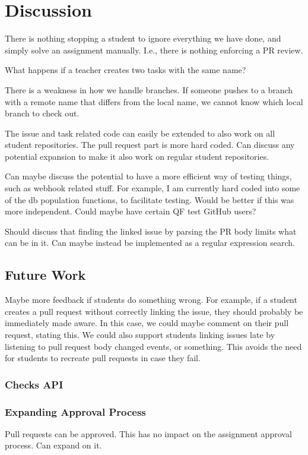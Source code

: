 
\chapter{Discussion}
\label{ch:discussion}

There is nothing stopping a student to ignore everything we have done, and simply solve an assignment manually.
I.e., there is nothing enforcing a PR review.

What happens if a teacher creates two tasks with the same name?

There is a weakness in how we handle branches.
If someone pushes to a branch with a remote name that differs from the local name, we cannot know which local branch to check out.

The issue and task related code can easily be extended to also work on all student repositories.
The pull request part is more hard coded.
Can discuss any potential expansion to make it also work on regular student repositories.

Can maybe discuss the potential to have a more efficient way of testing things, such as webhook related stuff.
For example, I am currently hard coded into some of the db population functions, to facilitate testing.
Would be better if this was more independent. 
Could maybe have certain QF test GitHub users?

Should discuss that finding the linked issue by parsing the PR body limits what can be in it.
Can maybe instead be implemented as a regular expression search.

\section{Future Work}

Maybe more feedback if students do something wrong.
For example, if a student creates a pull request without correctly linking the issue, they should probably be immediately made aware.
In this case, we could maybe comment on their pull request, stating this.
We could also support students linking issues late by listening to pull request body changed events, or something.
This avoids the need for students to recreate pull requests in case they fail.

\subsection{Checks API}

\subsection{Expanding Approval Process}
Pull requests can be approved. This has no impact on the assignment approval process. Can expand on it.

